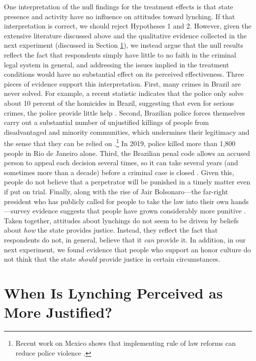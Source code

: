 \documentclass[12pt,a4paper]{article}
\begin{document}
One interpretation of the null findings for the treatment effects is that state presence and activity have no influence on attitudes toward lynching. If that interpretation is correct, we should reject Hypotheses 1 and 2. However, given the extensive literature discussed above and the qualitative evidence collected in the next experiment (discussed in Section \ref{sec:exp01}), we instead argue that the null results reflect the fact that respondents simply have little to no faith in the criminal legal system in general, and addressing the issues implied in the treatment conditions would have no substantial effect on its perceived effectiveness. Three pieces of evidence support this interpretation. First, many crimes in Brazil are never solved. For example, a recent statistic indicates that the police only solve about 10 percent of the homicides in Brazil, suggesting that even for serious crimes, the police provide little help \citep{pearson2018latam}. Second, Brazilian police forces themselves carry out a substantial number of unjustified killings of people from disadvantaged and minority communities, which undermines their legitimacy and the sense that they can be relied on \citep{willis2015killing}.\footnote{Recent work on Mexico shows that implementing rule of law reforms can reduce police violence \citep{magaloni2020institutionalized}.} In 2019, police killed more than 1,800 people in Rio de Janeiro alone. Third, the Brazilian penal code allows an accused person to appeal each decision several times, so it can take several years (and sometimes more than a decade) before a criminal case is closed \citep{sousa2005utilizaccao}. Given this, people do not believe that a perpetrator will be punished in a timely matter even if put on trial. Finally, along with the rise of Jair Bolsonaro---the far-right president who has publicly called for people to take the law into their own hands \citep{brant2021armas, uol2021bolsonaro}---survey evidence suggests that people have grown considerably more punitive \citep{datafolha2018penademorte}. Taken together, attitudes about lynchings do not seem to be driven by beliefs about \textit{how} the state provides justice. Instead, they reflect the fact that respondents do not, in general, believe that it \textit{can} provide it. In addition, in our next experiment, we found evidence that people who support an honor culture do not think that the state \textit{should} provide justice in certain circumstances. 

\section{When Is Lynching Perceived as More Justified?}
\label{sec:exp01}
\end{document}
